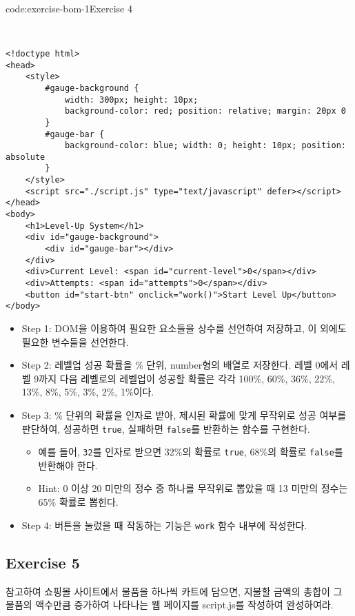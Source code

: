 \begin{codeenv}{code:exercise-bom-1}{Exercise 4}\begin{verbatim}


<!doctype html>
<head>
    <style>
        #gauge-background {
            width: 300px; height: 10px;
            background-color: red; position: relative; margin: 20px 0
        }
        #gauge-bar {
            background-color: blue; width: 0; height: 10px; position: absolute
        }
    </style>
    <script src="./script.js" type="text/javascript" defer></script>
</head>
<body>
    <h1>Level-Up System</h1>
    <div id="gauge-background">
        <div id="gauge-bar"></div>
    </div>
    <div>Current Level: <span id="current-level">0</span></div>
    <div>Attempts: <span id="attempts">0</span></div>
    <button id="start-btn" onclick="work()">Start Level Up</button>
</body>
\end{verbatim}
\end{codeenv}

\begin{itemize}
    \item Step 1: DOM을 이용하여 필요한 요소들을 상수를 선언하여 저장하고, 이 외에도 필요한 변수들을 선언한다.
    \item Step 2: 레벨업 성공 확률을 \% 단위, number형의 배열로 저장한다. 레벨 0에서 레벨 9까지 다음 레벨로의 레벨업이 성공할 확률은 각각 100\%, 60\%, 36\%, 22\%, 13\%, 8\%, 5\%, 3\%, 2\%, 1\%이다.
    \item Step 3: \% 단위의 확률을 인자로 받아, 제시된 확률에 맞게 무작위로 성공 여부를 판단하여, 성공하면 \texttt{true}, 실패하면 \texttt{false}를 반환하는 함수를 구현한다.
    \begin{itemize}
        \item 예를 들어, \texttt{32}를 인자로 받으면 32\%의 확률로 \texttt{true}, 68\%의 확률로 \texttt{false}를 반환해야 한다.
        \item Hint: 0 이상 20 미만의 정수 중 하나를 무작위로 뽑았을 때 13 미만의 정수는 65\% 확률로 뽑힌다.
    \end{itemize}
    \item Step 4: 버튼을 눌렀을 때 작동하는 기능은 \texttt{work} 함수 내부에 작성한다.
\end{itemize}

\subsection*{Exercise 5}

\을 참고하여 쇼핑몰 사이트에서 물품을 하나씩 카트에 담으면, 지불할 금액의 총합이 그 물품의 액수만큼 증가하여 나타나는 웹 페이지를 script.js를 작성하여 완성하여라.

